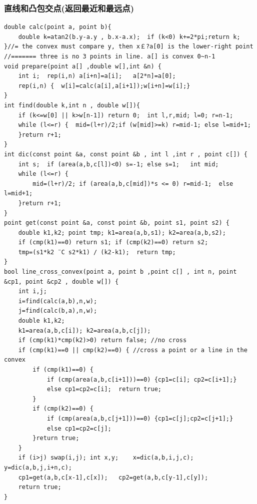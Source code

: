 \documentclass[landscape,a4paper]{article}
\begin{document}
\begin{spacing}{0.3}
\begin{multicols}{2}
\subsubsection{直线和凸包交点(返回最近和最远点)}
\begin{lstlisting}
double calc(point a, point b){
	double k=atan2(b.y-a.y , b.x-a.x);	if (k<0) k+=2*pi;return k;
}//= the convex must compare y, then x￡?a[0] is the lower-right point
//======= three is no 3 points in line. a[] is convex 0~n-1
void prepare(point a[] ,double w[],int &n) {
	int i;	rep(i,n) a[i+n]=a[i];	a[2*n]=a[0];
	rep(i,n) {	w[i]=calc(a[i],a[i+1]);w[i+n]=w[i];}
}
int find(double k,int n , double w[]){
	if (k<=w[0] || k>w[n-1]) return 0;	int l,r,mid; l=0; r=n-1;
	while (l<=r) {	mid=(l+r)/2;if (w[mid]>=k) r=mid-1; else l=mid+1;
	}return r+1;
}
int dic(const point &a, const point &b , int l ,int r , point c[]) {
	int s;	if (area(a,b,c[l])<0) s=-1; else s=1;	int mid;
	while (l<=r) {
		mid=(l+r)/2; if (area(a,b,c[mid])*s <= 0) r=mid-1;	else l=mid+1;
	}return r+1;
}
point get(const point &a, const point &b, point s1, point s2) {
	double k1,k2; point tmp; k1=area(a,b,s1); k2=area(a,b,s2);
	if (cmp(k1)==0) return s1; if (cmp(k2)==0) return s2;
	tmp=(s1*k2 ¨C s2*k1) / (k2-k1);  return tmp;
}
bool line_cross_convex(point a, point b ,point c[] , int n, point &cp1, point &cp2 , double w[]) {
	int i,j;
	i=find(calc(a,b),n,w);
	j=find(calc(b,a),n,w);
	double k1,k2;
	k1=area(a,b,c[i]); k2=area(a,b,c[j]);
	if (cmp(k1)*cmp(k2)>0) return false; //no cross	
	if (cmp(k1)==0 || cmp(k2)==0) {	//cross a point or a line in the convex
		if (cmp(k1)==0) {
			if (cmp(area(a,b,c[i+1]))==0) {cp1=c[i]; cp2=c[i+1];}
			else cp1=cp2=c[i];  return true;
		}
		if (cmp(k2)==0) {
			if (cmp(area(a,b,c[j+1]))==0) {cp1=c[j];cp2=c[j+1];}
			else cp1=cp2=c[j];
		}return true;
	}
	if (i>j) swap(i,j); int x,y;	x=dic(a,b,i,j,c); y=dic(a,b,j,i+n,c);
	cp1=get(a,b,c[x-1],c[x]);	cp2=get(a,b,c[y-1],c[y]);
	return true;
}
\end{lstlisting}

\end{multicols}
\end{spacing}
\end{document}
